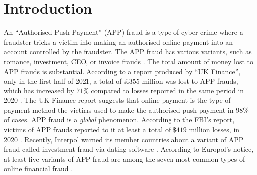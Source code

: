 

\section{Introduction}\label{sec::intro}

An  ``Authorised Push Payment'' (APP) fraud is a type of cyber-crime where a fraudster tricks a victim into making an authorised online payment into an account controlled by the fraudster.  The APP fraud has various variants, such as romance, investment, CEO, or invoice frauds \cite{overview-of-payment-fraud}. The total amount of money lost to  APP frauds is substantial. According to a report produced by ``UK Finance'',   only in the first half of 2021, a total of £$355$ million was lost to APP frauds, which has increased by  $71\%$  compared to losses reported in the same period in 2020 \cite{2021-Half-Year-Fraud-Update}. The UK Finance report suggests that online payment is the type of payment method the victims used to make the authorised push payment in  $98\%$  of cases. APP fraud is a \emph{global} phenomenon. According to the FBI's report, victims of APP frauds reported to it at least a total of  \$$419$ million losses, in 2020 \cite{internet-crime-report}. Recently, Interpol warned its member countries about a    variant of APP fraud called investment fraud via dating software \cite{interpol-notce}. According to  Europol’s notice, at least five variants of APP fraud are among the seven most common types of online financial fraud \cite{europol-notice}. 



